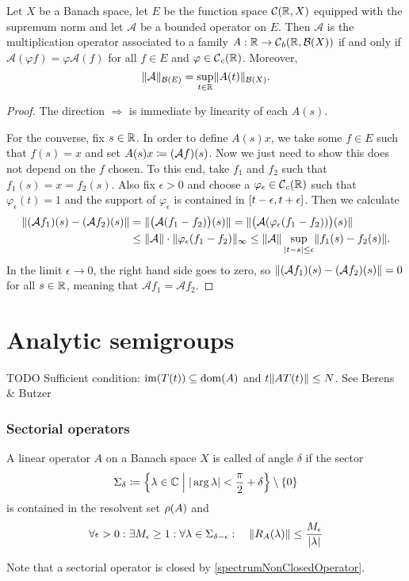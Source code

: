 \begin{proposition}
Let $X$ be a Banach space, let $E$ be the function space $\operatorname{\mathcal{C}}(\mathbb{R},X)$ equipped with the supremum norm and let $\mathcal{A}$ be a bounded operator on $E$. Then $\mathcal{A}$ is the multiplication operator associated to a family $A: \mathbb{R}\to \operatorname{\mathcal{C}}_b(\mathbb{R}, \operatorname{\mathcal{B}}(X))$ \textup{if and only if} $\mathcal{A}(\varphi f) = \varphi\mathcal{A}(f)$ for all $f\in E$ and $\varphi\in\operatorname{\mathcal{C}}_c(\mathbb{R})$. Moreover,
\[ \lVert\mathcal{A}\rVert_{\operatorname{\mathcal{B}}(E)} = \sup_{t\in\mathbb{R}}\lVert A(t)\rVert_{\operatorname{\mathcal{B}}(X)}. \]
\end{proposition}
\begin{proof}
The direction $\Rightarrow$ is immediate by linearity of each $A(s)$.

For the converse, fix $s\in \mathbb{R}$. In order to define $A(s)x$, we take some $f\in E$ such that $f(s) = x$ and set $A(s)x \coloneqq (\mathcal{A}f)(s)$. Now we just need to show this does not depend on the $f$ chosen. To this end, take $f_1$ and $f_2$ such that $f_1(s) = x = f_2(s)$. Also fix $\epsilon >0$ and choose a $\varphi_\epsilon\in\operatorname{\mathcal{C}}_c(\mathbb{R})$ such that $\varphi_\epsilon(t) = 1$ and the support of $\varphi_\epsilon$ is contained in $\interval{t-\epsilon, t+\epsilon}$. Then we calculate
\begin{align*}
\lVert(\mathcal{A}f_1)(s) - (\mathcal{A}f_2)(s)\rVert &= \lVert\big(\mathcal{A}(f_1 - f_2)\big)(s)\rVert = \lVert\big(\mathcal{A}(\varphi_\epsilon (f_1 - f_2))\big)(s)\rVert \\
&\leq \lVert\mathcal{A}\rVert\cdot\lVert\varphi_\epsilon (f_1-f_2)\rVert_\infty \leq \lVert\mathcal{A}\rVert \sup_{|t-s|\leq \epsilon}\lVert f_1(s)-f_2(s)\rVert.
\end{align*}
In the limit $\epsilon\to 0$, the right hand side goes to zero, so $\lVert(\mathcal{A}f_1)(s) - (\mathcal{A}f_2)(s)\rVert = 0$ for all $s\in \mathbb{R}$, meaning that $\mathcal{A}f_1 = \mathcal{A}f_2$.
\end{proof}

\chapter{Analytic semigroups}

TODO Sufficient condition: $\operatorname{im}(T(t)) \subseteq \operatorname{dom}(A)$ and $t\lVert AT(t)\rVert \leq N$. See Berens \& Butzer


\subsection{Sectorial operators}
\begin{definition}
A linear operator $A$ on a Banach space $X$ is called  of angle $\delta$ if the sector
\[ \Sigma_\delta \defeq \setbuilder{\lambda\in\C}{|\arg\lambda| < \frac{\pi}{2}+\delta}\setminus \{0\} \]
is contained in the resolvent set $\rho(A)$ and
\[ \forall \epsilon >0: \exists M_\epsilon \geq 1: \forall \lambda\in \Sigma_{\delta-\epsilon}: \quad \lVert R_A(\lambda)\rVert \leq \frac{M_\epsilon}{|\lambda|} \]
\end{definition}
Note that a sectorial operator is closed by \ref{spectrumNonClosedOperator}.

